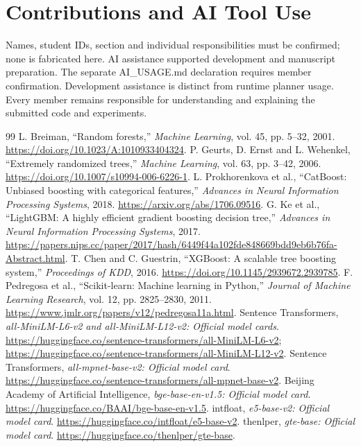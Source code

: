 \documentclass[11pt,a4paper]{article}
\begin{document}
\section*{Contributions and AI Tool Use}
Names, student IDs, section and individual responsibilities must be confirmed; none is fabricated here. AI assistance supported development and manuscript preparation. The separate AI\_USAGE.md declaration requires member confirmation. Development assistance is distinct from runtime planner usage. Every member remains responsible for understanding and explaining the submitted code and experiments.

\begin{thebibliography}{99}
 L. Breiman, ``Random forests,'' \emph{Machine Learning}, vol. 45, pp. 5--32, 2001. \url{https://doi.org/10.1023/A:1010933404324}.
 P. Geurts, D. Ernst and L. Wehenkel, ``Extremely randomized trees,'' \emph{Machine Learning}, vol. 63, pp. 3--42, 2006. \url{https://doi.org/10.1007/s10994-006-6226-1}.
 L. Prokhorenkova et al., ``CatBoost: Unbiased boosting with categorical features,'' \emph{Advances in Neural Information Processing Systems}, 2018. \url{https://arxiv.org/abs/1706.09516}.
 G. Ke et al., ``LightGBM: A highly efficient gradient boosting decision tree,'' \emph{Advances in Neural Information Processing Systems}, 2017. \url{https://papers.nips.cc/paper/2017/hash/6449f44a102fde848669bdd9eb6b76fa-Abstract.html}.
 T. Chen and C. Guestrin, ``XGBoost: A scalable tree boosting system,'' \emph{Proceedings of KDD}, 2016. \url{https://doi.org/10.1145/2939672.2939785}.
 F. Pedregosa et al., ``Scikit-learn: Machine learning in Python,'' \emph{Journal of Machine Learning Research}, vol. 12, pp. 2825--2830, 2011. \url{https://www.jmlr.org/papers/v12/pedregosa11a.html}.
 Sentence Transformers, \emph{all-MiniLM-L6-v2 and all-MiniLM-L12-v2: Official model cards}. \url{https://huggingface.co/sentence-transformers/all-MiniLM-L6-v2}; \url{https://huggingface.co/sentence-transformers/all-MiniLM-L12-v2}.
 Sentence Transformers, \emph{all-mpnet-base-v2: Official model card}. \url{https://huggingface.co/sentence-transformers/all-mpnet-base-v2}.
 Beijing Academy of Artificial Intelligence, \emph{bge-base-en-v1.5: Official model card}. \url{https://huggingface.co/BAAI/bge-base-en-v1.5}.
 intfloat, \emph{e5-base-v2: Official model card}. \url{https://huggingface.co/intfloat/e5-base-v2}.
 thenlper, \emph{gte-base: Official model card}. \url{https://huggingface.co/thenlper/gte-base}.

\end{thebibliography}
\end{document}
